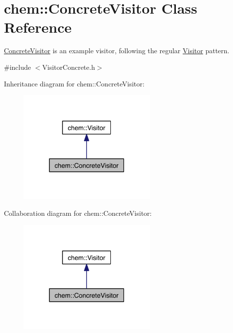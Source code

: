 \hypertarget{classchem_1_1ConcreteVisitor}{\section{chem\-:\-:Concrete\-Visitor Class Reference}
\label{classchem_1_1ConcreteVisitor}
}


\hyperlink{classchem_1_1ConcreteVisitor}{Concrete\-Visitor} is an example visitor, following the regular \hyperlink{classchem_1_1Visitor}{Visitor} pattern.  




{\ttfamily \#include $<$Visitor\-Concrete.\-h$>$}



Inheritance diagram for chem\-:\-:Concrete\-Visitor\-:
\nopagebreak
\begin{figure}[H]
\begin{center}
\leavevmode
\includegraphics[width=194pt]{classchem_1_1ConcreteVisitor__inherit__graph}
\end{center}
\end{figure}


Collaboration diagram for chem\-:\-:Concrete\-Visitor\-:
\nopagebreak
\begin{figure}[H]
\begin{center}
\leavevmode
\includegraphics[width=194pt]{classchem_1_1ConcreteVisitor__coll__graph}
\end{center}
\end{figure}
